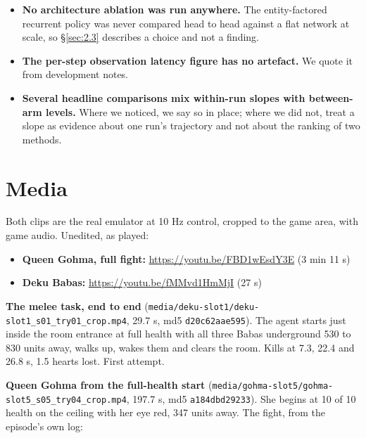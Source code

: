 \documentclass[11pt]{article}
\begin{document}
\begin{itemize}
\item \textbf{No architecture ablation was run anywhere.} The entity-factored recurrent policy was never compared head to head against a flat network at scale, so \S\ref{sec:2.3} describes a choice and not a finding.
\item \textbf{The per-step observation latency figure has no artefact.} We quote it from development notes.
\item \textbf{Several headline comparisons mix within-run slopes with between-arm levels.} Where we noticed, we say so in place; where we did not, treat a slope as evidence about one run's trajectory and not about the ranking of two methods.
\end{itemize}


\section{Media}
\label{sec:11}

Both clips are the real emulator at 10 Hz control, cropped to the game area, with game audio. Unedited, as played:

\begin{itemize}
\item \textbf{Queen Gohma, full fight:} \url{https://youtu.be/FBD1wEsdY3E} (3 min 11 s)
\item \textbf{Deku Babas:} \url{https://youtu.be/fMMvd1HmMjI} (27 s)
\end{itemize}

\textbf{The melee task, end to end} (\texttt{media/\allowbreak{}deku-\allowbreak{}slot1/\allowbreak{}deku-\allowbreak{}slot1\_\allowbreak{}s01\_\allowbreak{}try01\_\allowbreak{}crop.mp4}, 29.7 s, md5 \texttt{d20c62aae595}). The agent starts just inside the room entrance at full health with all three Babas underground 530 to 830 units away, walks up, wakes them and clears the room. Kills at 7.3, 22.4 and 26.8 s, 1.5 hearts lost. First attempt.

\textbf{Queen Gohma from the full-health start} (\texttt{media/\allowbreak{}gohma-\allowbreak{}slot5/\allowbreak{}gohma-\allowbreak{}slot5\_\allowbreak{}s05\_\allowbreak{}try04\_\allowbreak{}crop.mp4}, 197.7 s, md5 \texttt{a184dbd29233}). She begins at 10 of 10 health on the ceiling with her eye red, 347 units away. The fight, from the episode's own log:
\end{document}
